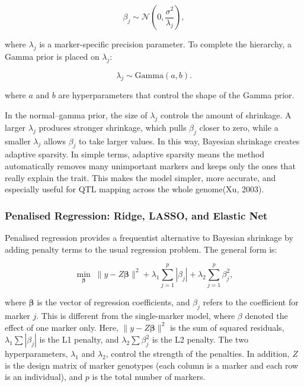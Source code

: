 \documentclass[
  letterpaper,
  DIV=11,
  numbers=noendperiod]{scrartcl}
\begin{document}
\[
\beta_j \sim \mathcal{N}\!\left(0, \frac{\sigma^2}{\lambda_j}\right),
\]

where \(\lambda_j\) is a marker-specific precision parameter. To
complete the hierarchy, a Gamma prior is placed on \(\lambda_j\):

\[
\lambda_j \sim \text{Gamma}(a,b).
\]

where \(a\) and \(b\) are hyperparameters that control the shape of the
Gamma prior.

In the normal--gamma prior, the size of \(\lambda_j\) controls the
amount of shrinkage. A larger \(\lambda_j\) produces stronger shrinkage,
which pulls \(\beta_j\) closer to zero, while a smaller \(\lambda_j\)
allows \(\beta_j\) to take larger values. In this way, Bayesian
shrinkage creates adaptive sparsity. In simple terms, adaptive sparsity
means the method automatically removes many unimportant markers and
keeps only the ones that really explain the trait. This makes the model
simpler, more accurate, and especially useful for QTL mapping across the
whole genome(Xu, 2003).

\subsubsection{Penalised Regression: Ridge, LASSO, and Elastic
Net}\label{penalised-regression-ridge-lasso-and-elastic-net}

Penalised regression provides a frequentist alternative to Bayesian
shrinkage by adding penalty terms to the usual regression problem. The
general form is:

\[
\min_{\boldsymbol{\beta}} \; \|y - Z\boldsymbol{\beta}\|^2 
+ \lambda_1 \sum_{j=1}^p |\beta_j| 
+ \lambda_2 \sum_{j=1}^p \beta_j^2,
\]

where \(\boldsymbol{\beta}\) is the vector of regression coefficients,
and \(\beta_j\) refers to the coefficient for marker \(j\). This is
different from the single-marker model, where \(\beta\) denoted the
effect of one marker only. Here, \(\|y - Z\boldsymbol{\beta}\|^2\) is
the sum of squared residuals, \(\lambda_1 \sum |\beta_j|\) is the L1
penalty, and \(\lambda_2 \sum \beta_j^2\) is the L2 penalty. The two
hyperparameters, \(\lambda_1\) and \(\lambda_2\), control the strength
of the penalties. In addition, \(Z\) is the design matrix of marker
genotypes (each column is a marker and each row is an individual), and
\(p\) is the total number of markers.
\end{document}
